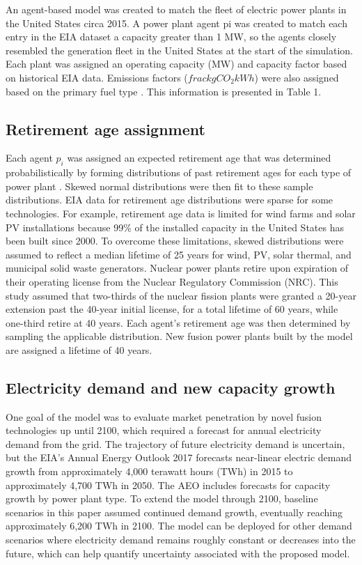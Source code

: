 \documentclass[review]{elsarticle}
\begin{document}
An agent-based model was created to match the fleet of electric power plants in the United States circa 2015. A power plant agent pi was created to match each entry in the EIA dataset a capacity greater than 1 MW, so the agents closely resembled the generation fleet in the United States at the start of the simulation. Each plant was assigned an operating capacity (MW) and capacity factor based on historical EIA data. Emissions factors ($frac{kg CO_2}{kWh}$) were also assigned based on the primary fuel type \citep{EIA_1605_2016}. This information is presented in Table 1.

\subsection{Retirement age assignment}

Each agent $p_i$ was assigned an expected retirement age that was determined probabilistically by forming distributions of past retirement ages for each type of power plant \citep{EIA2016}. Skewed normal distributions were then fit to these sample distributions. EIA data for retirement age distributions were sparse for some technologies. For example, retirement age data is limited for wind farms and solar PV installations because 99\% of the installed capacity in the United States has been built since 2000. To overcome these limitations, skewed distributions were assumed to reflect a median lifetime of 25 years for wind, PV, solar thermal, and municipal solid waste generators. Nuclear power plants retire upon expiration of their operating license from the Nuclear Regulatory Commission (NRC). This study assumed that two-thirds of the nuclear fission plants were granted a 20-year extension past the 40-year initial license, for a total lifetime of 60 years, while one-third retire at 40 years. Each agent's retirement age was then determined by sampling the applicable distribution. New fusion power plants built by the model are assigned a lifetime of 40 years.

\subsection{Electricity demand and new capacity growth}

One goal of the model was to evaluate market penetration by novel fusion technologies up until 2100, which required a forecast for annual electricity demand from the grid. The trajectory of future electricity demand is uncertain, but the EIA's Annual Energy Outlook 2017 \citep{NEMS2014} forecasts near-linear electric demand growth from approximately 4,000 terawatt hours (TWh) in 2015 to approximately 4,700 TWh in 2050. The AEO includes forecasts for capacity growth by power plant type. To extend the model through 2100, baseline scenarios in this paper assumed continued demand growth, eventually reaching approximately 6,200 TWh in 2100. The model can be deployed for other demand scenarios where electricity demand remains roughly constant or decreases into the future, which can help quantify uncertainty associated with the proposed model. \citep{Cook2002}
\end{document}

